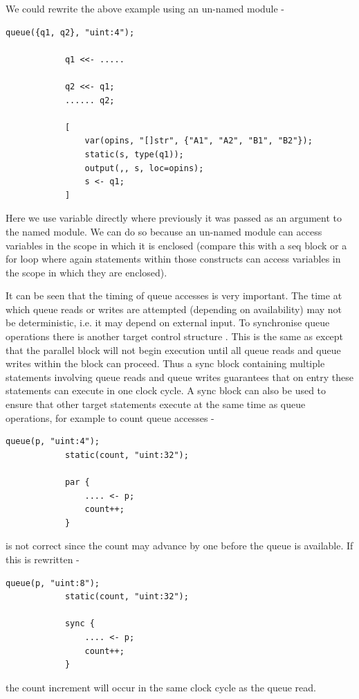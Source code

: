         We could rewrite the above example using an un-named module -
        \begin{lstlisting}[language=threepl]
            queue({q1, q2}, "uint:4");

            q1 <<- .....

            q2 <<- q1;
            ...... q2;

            [
                var(opins, "[]str", {"A1", "A2", "B1", "B2"});
                static(s, type(q1));
                output(,, s, loc=opins);
                s <- q1;
            ]
        \end{lstlisting}
        Here we use variable  directly where previously it was passed as
        an argument to the named module. We can do so because an un-named
        module can access variables in the scope in which it is enclosed (compare
        this with a seq block or a for loop where again statements within those
        constructs can access variables in the scope in which they are enclosed).

        It can be seen that the timing of queue accesses is very important. The time
        at which queue reads or writes are attempted (depending on availability) may
        not be deterministic, i.e. it may depend on external input. To synchronise
        queue operations there is another target control structure .
        This is the same as  except that the parallel block will
        not begin execution until all queue reads and queue writes within the block
        can proceed. Thus a sync block containing multiple statements involving
        queue reads and queue writes guarantees that on entry these statements can
        execute in one clock cycle. A sync block can also be used to ensure that
        other target statements execute at the same time as queue operations, for
        example to count queue accesses -
        \begin{lstlisting}[language=threepl]
            queue(p, "uint:4");
            static(count, "uint:32");

            par {
                .... <- p;
                count++;
            }
        \end{lstlisting}
        is not correct since the count may advance by one before the queue is
        available. If this is rewritten -
        \begin{lstlisting}[language=threepl]
            queue(p, "uint:8");
            static(count, "uint:32");

            sync {
                .... <- p;
                count++;
            }
        \end{lstlisting}
        the count increment will occur in the same clock cycle as the queue read.

